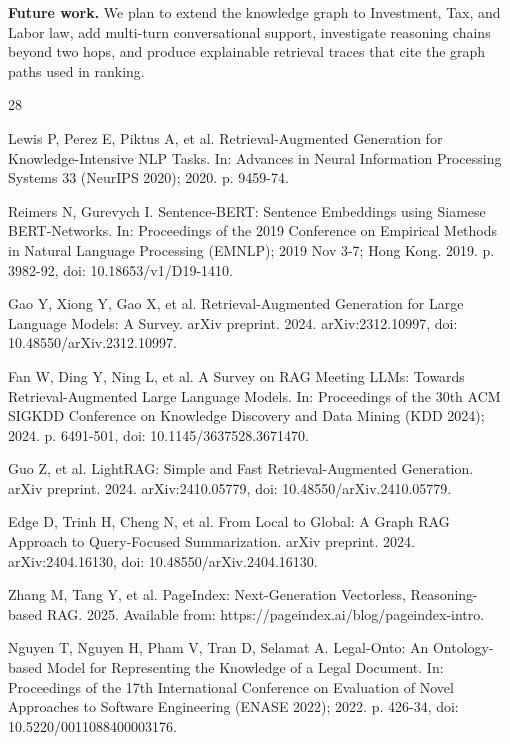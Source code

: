 \documentclass{IOS-Book-Article}
\begin{document}
\textbf{Future work.} We plan to extend the knowledge graph to Investment, Tax, and Labor law, add multi-turn conversational support, investigate reasoning chains beyond two hops, and produce explainable retrieval traces that cite the graph paths used in ranking.

\begin{thebibliography}{28}
\setlength{\itemsep}{0pt}\setlength{\parsep}{0pt}\setlength{\parskip}{0pt}

Lewis P, Perez E, Piktus A, et al. Retrieval-Augmented Generation for Knowledge-Intensive NLP Tasks. In: Advances in Neural Information Processing Systems 33 (NeurIPS 2020); 2020. p. 9459-74.

Reimers N, Gurevych I. Sentence-BERT: Sentence Embeddings using Siamese BERT-Networks. In: Proceedings of the 2019 Conference on Empirical Methods in Natural Language Processing (EMNLP); 2019 Nov 3-7; Hong Kong. 2019. p. 3982-92, doi: 10.18653/v1/D19-1410.

Gao Y, Xiong Y, Gao X, et al. Retrieval-Augmented Generation for Large Language Models: A Survey. arXiv preprint. 2024. arXiv:2312.10997, doi: 10.48550/arXiv.2312.10997.

Fan W, Ding Y, Ning L, et al. A Survey on RAG Meeting LLMs: Towards Retrieval-Augmented Large Language Models. In: Proceedings of the 30th ACM SIGKDD Conference on Knowledge Discovery and Data Mining (KDD 2024); 2024. p. 6491-501, doi: 10.1145/3637528.3671470.

Guo Z, et al. LightRAG: Simple and Fast Retrieval-Augmented Generation. arXiv preprint. 2024. arXiv:2410.05779, doi: 10.48550/arXiv.2410.05779.

Edge D, Trinh H, Cheng N, et al. From Local to Global: A Graph RAG Approach to Query-Focused Summarization. arXiv preprint. 2024. arXiv:2404.16130, doi: 10.48550/arXiv.2404.16130.

Zhang M, Tang Y, et al. PageIndex: Next-Generation Vectorless, Reasoning-based RAG. 2025. Available from: https://pageindex.ai/blog/pageindex-intro.

Nguyen T, Nguyen H, Pham V, Tran D, Selamat A. Legal-Onto: An Ontology-based Model for Representing the Knowledge of a Legal Document. In: Proceedings of the 17th International Conference on Evaluation of Novel Approaches to Software Engineering (ENASE 2022); 2022. p. 426-34, doi: 10.5220/0011088400003176.


\end{thebibliography}
\end{document}
